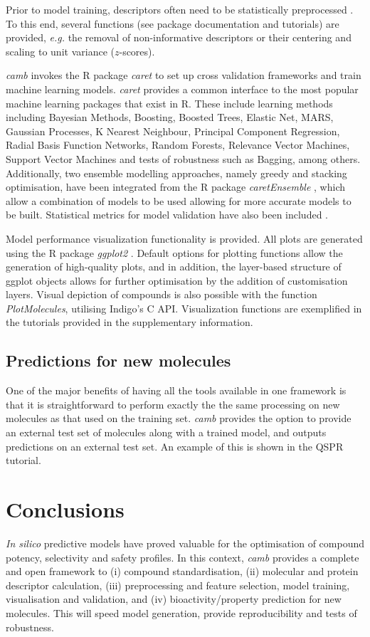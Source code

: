 \documentclass{bioinfo}
\begin{document}
Prior to model training, descriptors often need to be statistically preprocessed \citep{andersson}.
To this end, several functions (see package documentation and tutorials)
are provided, {\it e.g.} the removal of non-informative descriptors or
their centering and scaling to unit variance ($z$-scores).

{\it camb} invokes the R package {\it caret} to set up cross validation frameworks and
train machine learning models. {\it caret} provides a common interface to the most popular machine learning packages that exist in R.
These include learning methods including 
Bayesian Methods, Boosting, Boosted Trees, Elastic Net, MARS,
Gaussian Processes, K Nearest Neighbour, Principal Component
Regression, Radial Basis Function Networks, Random Forests,
Relevance Vector Machines, Support Vector Machines and tests of robustness such as Bagging, among
others.
Additionally, two ensemble modelling approaches, namely greedy and stacking optimisation,
have been integrated from the R package {\it caretEnsemble} \citep{caretEnsemble}, which allow a combination of models to be used 
allowing for more accurate models to be built.
Statistical metrics for model validation have also been included \citep{beware}.

Model performance visualization functionality is provided. All plots are generated using the R package {\it ggplot2} \citep{ggplot2}.
Default options for plotting functions allow the generation of high-quality plots,
and in addition, the layer-based structure of ggplot objects allows for further optimisation
by the addition of customisation layers.  
Visual depiction of compounds is also possible with the function {\it PlotMolecules},
utilising Indigo's C API. Visualization functions are exemplified in the tutorials provided in the supplementary information.

\subsection{Predictions for new molecules}
One of the major benefits of having all the tools available in one framework is that 
 it is straightforward to perform exactly the the same processing on new molecules as that used on the training set.
{\it camb} provides the option to provide an external test set of molecules along with a trained model, 
and outputs predictions on an external test set. An example of this is shown in the QSPR tutorial.

\section{Conclusions}
{\it In silico} predictive models have proved valuable
for the optimisation of compound potency, selectivity and safety profiles.
In this context, {\it camb} provides a complete and open framework
to (i) compound standardisation, (ii) molecular and protein descriptor calculation,
(iii) preprocessing and feature selection, model training, visualisation and validation, and 
(iv) bioactivity/property prediction for new molecules.
This will speed model generation, provide reproducibility and tests of robustness.
\end{document}
